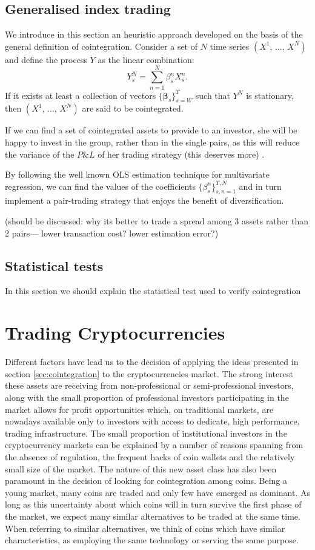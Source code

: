 \documentclass[a4paper,11pt]{article}
\theoremstyle{remark}
\theoremstyle{plain}
\newcommand\ab[1]{{\color{blue} #1 }}
\begin{document}
\subsection{Generalised index trading}
\label{sec:index}
We introduce in this section an heuristic approach developed on the basis of the general definition of cointegration. Consider a set of $N$ time series $(X^1,\,\dots,\,X^N)$ and define the process $Y$ as the linear combination:
\[
Y^N_s=\sum_{n=1}^{N}\beta^n_s X^n_s.
\]
If it exists at least a collection of vectors $\{\boldsymbol{\beta}_s\}_{s=W}^{T}$ such that $Y^N$ is stationary, then $(X^1,\,\dots,\,X^N)$ are said to be cointegrated.

If we can find a set of cointegrated assets to provide to an investor, she will be happy to invest in the group, rather than in the single pairs, as this will reduce the variance of the $P\&L$ of her trading strategy \ab{(this deserves more)}. 

By following the well known OLS estimation technique for multivariate regression, we can find the values of the coefficients $\{\beta_s^n\}_{s,n=1}^{T,N}$ and in turn implement a pair-trading strategy that enjoys the benefit of diversification.

\ab{(should be discussed: why its better to trade a spread among 3 assets rather than 2 pairs--- lower transaction cost? lower estimation error?) }

\subsection{Statistical tests}
 
\ab{In this section we should explain the statistical test used to verify cointegration}

\section{Trading Cryptocurrencies}
\label{sec:cryptos}

Different factors have lead us to the decision of applying the ideas presented in section \ref{sec:cointegration} to the cryptocurrencies market. The strong interest these assets are receiving from non-professional or semi-professional investors, along with the small proportion of professional investors participating in the market allows for profit opportunities which, on traditional markets, are nowadays available only to investors with access to dedicate, high performance, trading infrastructure. The small proportion of institutional investors in the cryptocurrency markets can be explained by a number of reasons spanning from the absence of regulation, the frequent hacks of coin wallets and the relatively small size of the market. The nature of this new asset class has also been paramount in the decision of looking for cointegration among coins. Being a young market, many coins are traded and only few have emerged as dominant. As long as this uncertainty about which coins will in turn survive the first phase of the market, we expect many similar alternatives to be traded at the same time. When referring to similar alternatives, we think of coins which have similar characteristics, as employing the same technology or serving the same purpose.
\end{document}
